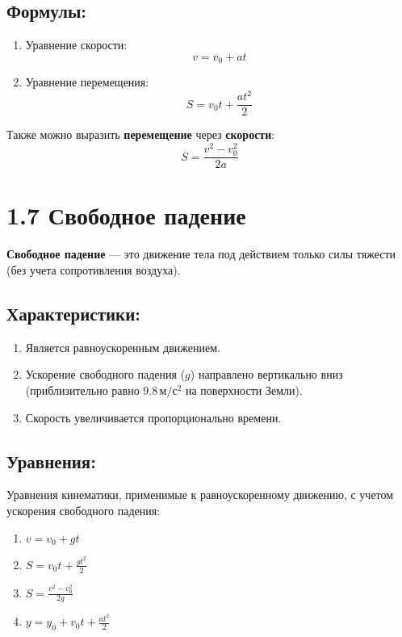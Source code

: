 \documentclass[a4paper,12pt]{article}
\begin{document}
\subsection*{Формулы:}
\vspace{-3pt}
\begin{enumerate} [itemsep=0pt, topsep=0pt, parsep=3pt]
    \item Уравнение скорости:
    \vspace{-0.05em}
    $$ v = v_0 + at $$ 
    \item Уравнение перемещения:
    \vspace{-0.05em}
    $$ S = v_0 t + \frac{at^2}{2} $$ 
\end{enumerate}
Также можно выразить \textbf{перемещение} через \textbf{скорости}:
\vspace{-0.05em}
\[
S = \frac{v^2 - v_0^2}{2a}
\]


\section*{1.7 Свободное падение}
\vspace{-9pt}
\textbf{Свободное падение} — это движение тела под действием только силы тяжести (без учета сопротивления воздуха).
\vspace{-9pt}
\subsection*{Характеристики:}
\vspace{-3pt}
\begin{enumerate} [itemsep=0pt, topsep=0pt, parsep=3pt]
    \item Является равноускоренным движением.
    \item Ускорение свободного падения ($g$) направлено вертикально вниз (приблизительно равно $9.8 \, м/с^2$ на поверхности Земли).
    \item Скорость увеличивается пропорционально времени.
\end{enumerate}
\vspace{-9pt}
\subsection*{Уравнения:}
\vspace{-3pt}
Уравнения кинематики, применимые к равноускоренному движению, с учетом ускорения свободного падения:
\begin{enumerate} [itemsep=0pt, topsep=0pt, parsep=3pt]
    \item $v = v_0 + gt$
    \item $S = v_0 t + \frac{gt^2}{2}$
    \item $S = \frac{v^2 - v_0^2}{2g}$
    \item $y = y_0 + v_0 t + \frac{at^2}{2}$
\end{enumerate}
\end{document}
